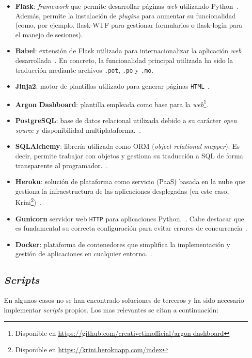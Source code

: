 \begin{itemize}
	\item \textbf{Flask}: \textit{framework} que permite desarrollar páginas \textit{web} utilizando Python~\cite{flask}. Además, permite la instalación de \textit{plugins} para aumentar su funcionalidad (como, por ejemplo, flask-WTF para gestionar formularios o flask-login para el manejo de sesiones). 
	\item \textbf{Babel}: extensión de Flask utilizada para internacionalizar la aplicación \textit{web} desarrollada~\cite{flaskBabel}. En concreto, la funcionalidad principal utilizada ha sido la traducción mediante archivos \texttt{.pot}, \texttt{.po} y \texttt{.mo}.
	\item \textbf{Jinja2}: motor de plantillas utilizado para generar páginas \texttt{HTML}~\cite{jinja}.
	\item \textbf{Argon Dashboard}: plantilla empleada como base para la \textit{web}\footnote{Disponible en \url{https://github.com/creativetimofficial/argon-dashboard}}.
	\item \textbf{PostgreSQL}: base de datos relacional utilizada debido a su carácter \textit{open source} y disponibilidad multiplataforma.~\cite{postgresql}.
	\item \textbf{SQLAlchemy}: librería utilizada como ORM (\textit{object-relational mapper}). Es decir, permite trabajar con objetos y gestiona su traducción a SQL de forma transparente al programador.~\cite{SQLAlchemy}.
	\item \textbf{Heroku}: solución de plataforma como servicio (PaaS) basada en la nube que gestiona la infraestructura de las aplicaciones desplegadas (en este caso, Krini\footnote{Disponible en \url{https://krini.herokuapp.com/index}})~\cite{heroku}.
	\item \textbf{Gunicorn} servidor web \texttt{HTTP} para aplicaciones Python.~\cite{gunicorn}. Cabe destacar que es fundamental su correcta configuración para evitar errores de concurrencia~\cite{herokuPreload}.
	\item \textbf{Docker}: plataforma de contenedores que simplifica la implementación y gestión de aplicaciones en cualquier entorno.~\cite{docker}.
\end{itemize}

\subsection{\textit{Scripts}} 

En algunos casos no se han encontrado soluciones de terceros y ha sido necesario implementar \textit{scripts} propios. Los mas relevantes se citan a continuación:

